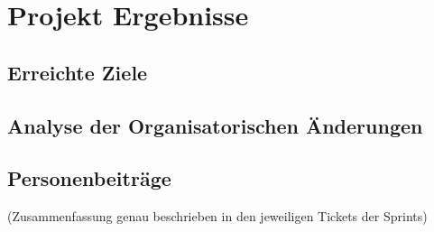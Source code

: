 
\chapter{Projekt Ergebnisse}

\section{Erreichte Ziele}

\section{Analyse der Organisatorischen Änderungen}
\section{Personenbeiträge}
(Zusammenfassung genau beschrieben in den jeweiligen Tickets der Sprints)

